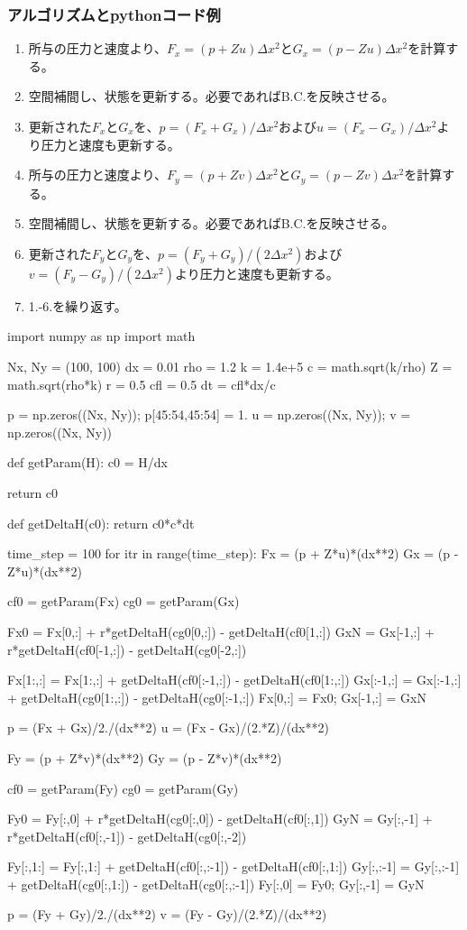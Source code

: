 \documentclass[dvipdfmx, 9pt, a4paper]{jsarticle}
\begin{document}
\subsubsection{アルゴリズムとpythonコード例}
\begin{tcolorbox}[title=FVMにおける2次元移流方程式の求解]
\begin{enumerate}
\item 所与の圧力と速度より、$F_x=(p+Zu)\Delta x^2$と$G_x=(p-Zu)\Delta x^2$を計算する。
\item 空間補間し、状態を更新する。必要であればB.C.を反映させる。
\item 更新された$F_x$と$G_x$を、$p=(F_x+G_x)/\Delta x^2$および$u=(F_x-G_x)/\Delta x^2$より圧力と速度も更新する。
\item 所与の圧力と速度より、$F_y=(p+Zv)\Delta x^2$と$G_y=(p-Zv)\Delta x^2$を計算する。
\item 空間補間し、状態を更新する。必要であればB.C.を反映させる。
\item 更新された$F_y$と$G_y$を、$p=(F_y+G_y)/(2\Delta x^2)$および$v=(F_y-G_y)/(2\Delta x^2)$より圧力と速度も更新する。
\item 1.-6.を繰り返す。
\end{enumerate}
\end{tcolorbox}
\begin{python}
import numpy as np
import math

Nx, Ny = (100, 100)
dx = 0.01
rho = 1.2
k = 1.4e+5
c = math.sqrt(k/rho)
Z = math.sqrt(rho*k)
r = 0.5
cfl = 0.5
dt = cfl*dx/c

p = np.zeros((Nx, Ny)); p[45:54,45:54] = 1.
u = np.zeros((Nx, Ny)); v = np.zeros((Nx, Ny))


def getParam(H):
	c0 = H/dx

	return c0

def getDeltaH(c0):
	return c0*c*dt

time_step = 100
for itr in range(time_step):
	Fx = (p + Z*u)*(dx**2)
	Gx = (p - Z*u)*(dx**2)

	cf0 = getParam(Fx)
	cg0 = getParam(Gx)

	Fx0 = Fx[0,:] + r*getDeltaH(cg0[0,:]) - getDeltaH(cf0[1,:])
	GxN = Gx[-1,:] + r*getDeltaH(cf0[-1,:]) - getDeltaH(cg0[-2,:])

	Fx[1:,:] = Fx[1:,:] + getDeltaH(cf0[:-1,:]) - getDeltaH(cf0[1:,:])
	Gx[:-1,:] = Gx[:-1,:] + getDeltaH(cg0[1:,:]) - getDeltaH(cg0[:-1,:])
	Fx[0,:] = Fx0; Gx[-1,:] = GxN

	p = (Fx + Gx)/2./(dx**2)
	u = (Fx - Gx)/(2.*Z)/(dx**2)

	Fy = (p + Z*v)*(dx**2)
	Gy = (p - Z*v)*(dx**2)

	cf0 = getParam(Fy)
	cg0 = getParam(Gy)

	Fy0 = Fy[:,0] + r*getDeltaH(cg0[:,0]) - getDeltaH(cf0[:,1])
	GyN = Gy[:,-1] + r*getDeltaH(cf0[:,-1]) - getDeltaH(cg0[:,-2])

	Fy[:,1:] = Fy[:,1:] + getDeltaH(cf0[:,:-1]) - getDeltaH(cf0[:,1:])
	Gy[:,:-1] = Gy[:,:-1] + getDeltaH(cg0[:,1:]) - getDeltaH(cg0[:,:-1])
	Fy[:,0] = Fy0; Gy[:,-1] = GyN

	p = (Fy + Gy)/2./(dx**2)
	v = (Fy - Gy)/(2.*Z)/(dx**2)
\end{python}
\end{document}
